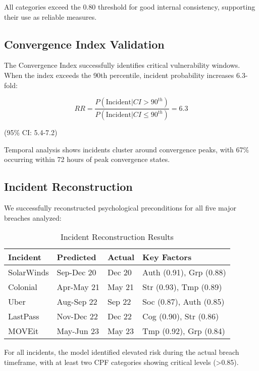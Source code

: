 \documentclass[10pt,twocolumn]{IEEEtran}
\begin{document}
All categories exceed the 0.80 threshold for good internal consistency, supporting their use as reliable measures.

\subsection{Convergence Index Validation}

The Convergence Index successfully identifies critical vulnerability windows. When the index exceeds the 90th percentile, incident probability increases 6.3-fold:

\begin{equation}
RR = \frac{P(\text{Incident} | CI > 90^{th})}{P(\text{Incident} | CI \leq 90^{th})} = 6.3
\end{equation}

(95\% CI: 5.4-7.2)

Temporal analysis shows incidents cluster around convergence peaks, with 67\% occurring within 72 hours of peak convergence states.

\subsection{Incident Reconstruction}

We successfully reconstructed psychological preconditions for all five major breaches analyzed:

\begin{table}[h]
\caption{Incident Reconstruction Results}
\label{tab:reconstruction}
\centering
\small
\begin{tabular}{@{}llll@{}}
\toprule
Incident & Predicted & Actual & Key Factors \\
\midrule
SolarWinds & Sep-Dec 20 & Dec 20 & Auth (0.91), Grp (0.88) \\
Colonial & Apr-May 21 & May 21 & Str (0.93), Tmp (0.89) \\
Uber & Aug-Sep 22 & Sep 22 & Soc (0.87), Auth (0.85) \\
LastPass & Nov-Dec 22 & Dec 22 & Cog (0.90), Str (0.86) \\
MOVEit & May-Jun 23 & May 23 & Tmp (0.92), Grp (0.84) \\
\bottomrule
\end{tabular}
\end{table}

For all incidents, the model identified elevated risk during the actual breach timeframe, with at least two CPF categories showing critical levels (>0.85).
\end{document}
